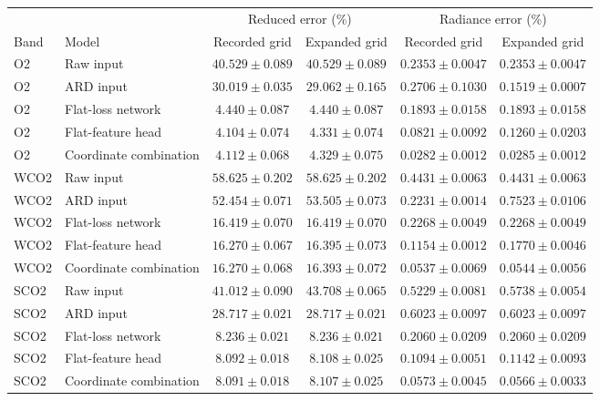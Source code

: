 \begin{tabular}{llcccc}
\toprule
& & \multicolumn{2}{c}{Reduced error (\%)} & \multicolumn{2}{c}{Radiance error (\%)} \\
\cmidrule(lr){3-4}\cmidrule(lr){5-6}
Band & Model & Recorded grid & Expanded grid & Recorded grid & Expanded grid \\
\midrule
O2 & Raw input & $40.529\pm0.089$ & $40.529\pm0.089$ & $0.2353\pm0.0047$ & $0.2353\pm0.0047$ \\
O2 & ARD input & $30.019\pm0.035$ & $29.062\pm0.165$ & $0.2706\pm0.1030$ & $0.1519\pm0.0007$ \\
O2 & Flat-loss network & $4.440\pm0.087$ & $4.440\pm0.087$ & $0.1893\pm0.0158$ & $0.1893\pm0.0158$ \\
O2 & Flat-feature head & $4.104\pm0.074$ & $4.331\pm0.074$ & $0.0821\pm0.0092$ & $0.1260\pm0.0203$ \\
O2 & Coordinate combination & $4.112\pm0.068$ & $4.329\pm0.075$ & $0.0282\pm0.0012$ & $0.0285\pm0.0012$ \\
\addlinespace
WCO2 & Raw input & $58.625\pm0.202$ & $58.625\pm0.202$ & $0.4431\pm0.0063$ & $0.4431\pm0.0063$ \\
WCO2 & ARD input & $52.454\pm0.071$ & $53.505\pm0.073$ & $0.2231\pm0.0014$ & $0.7523\pm0.0106$ \\
WCO2 & Flat-loss network & $16.419\pm0.070$ & $16.419\pm0.070$ & $0.2268\pm0.0049$ & $0.2268\pm0.0049$ \\
WCO2 & Flat-feature head & $16.270\pm0.067$ & $16.395\pm0.073$ & $0.1154\pm0.0012$ & $0.1770\pm0.0046$ \\
WCO2 & Coordinate combination & $16.270\pm0.068$ & $16.393\pm0.072$ & $0.0537\pm0.0069$ & $0.0544\pm0.0056$ \\
\addlinespace
SCO2 & Raw input & $41.012\pm0.090$ & $43.708\pm0.065$ & $0.5229\pm0.0081$ & $0.5738\pm0.0054$ \\
SCO2 & ARD input & $28.717\pm0.021$ & $28.717\pm0.021$ & $0.6023\pm0.0097$ & $0.6023\pm0.0097$ \\
SCO2 & Flat-loss network & $8.236\pm0.021$ & $8.236\pm0.021$ & $0.2060\pm0.0209$ & $0.2060\pm0.0209$ \\
SCO2 & Flat-feature head & $8.092\pm0.018$ & $8.108\pm0.025$ & $0.1094\pm0.0051$ & $0.1142\pm0.0093$ \\
SCO2 & Coordinate combination & $8.091\pm0.018$ & $8.107\pm0.025$ & $0.0573\pm0.0045$ & $0.0566\pm0.0033$ \\
\bottomrule
\end{tabular}
